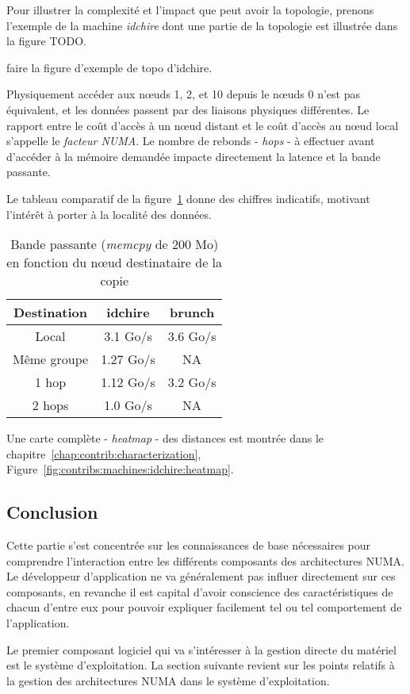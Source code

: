 Pour illustrer la complexité et l'impact que peut avoir la topologie, prenons l'exemple de la machine \emph{idchire} dont une partie de la topologie est illustrée dans la figure TODO.
\begin{todo}
  faire la figure d'exemple de topo d'idchire.
\end{todo}

Physiquement accéder aux nœuds 1, 2, et 10 depuis le nœuds 0 n'est pas équivalent, et les données passent par des liaisons physiques différentes.
Le rapport entre le coût d'accès à un nœud distant et le coût d'accès au nœud local s'appelle le \emph{facteur NUMA}.
Le nombre de rebonds - \emph{hops} - à effectuer avant d'accéder à la mémoire demandée impacte directement la latence et la bande passante.

Le tableau comparatif de la figure~\ref{tab:topologie-hops} donne des chiffres indicatifs, motivant l'intérêt à porter à la localité des données.

\begin{table}[ht]
\def\arraystretch{1.5}
\centering
\begin{tabular}{|c||c|c|}\hline
  Destination & idchire & brunch  \\ \hline
 Local & 3.1 Go/s & 3.6 Go/s \\ \hline
 Même groupe & 1.27 Go/s & NA \\ \hline
 1 hop & 1.12 Go/s & 3.2 Go/s \\ \hline
 2 hops & 1.0 Go/s & NA \\ \hline
\end{tabular}
\caption{Bande passante (\emph{memcpy} de 200 Mo) en fonction du nœud destinataire de la copie}\label{tab:topologie-hops}
\end{table}

Une carte complète - \emph{heatmap} - des distances est montrée dans le chapitre~\ref{chap:contrib:characterization}, Figure~\ref{fig:contribs:machines:idchire:heatmap}.


\subsection*{Conclusion}

Cette partie s'est concentrée sur les connaissances de base nécessaires pour comprendre l'interaction entre les différents composants des architectures NUMA.
Le développeur d'application ne va généralement pas influer directement sur ces composants, en revanche il est capital d'avoir conscience des caractéristiques de chacun d'entre eux pour pouvoir expliquer facilement tel ou tel comportement de l'application.

Le premier composant logiciel qui va s'intéresser à la gestion directe du matériel est le système d'exploitation.
La section suivante revient sur les points relatifs à la gestion des architectures NUMA dans le système d'exploitation.
